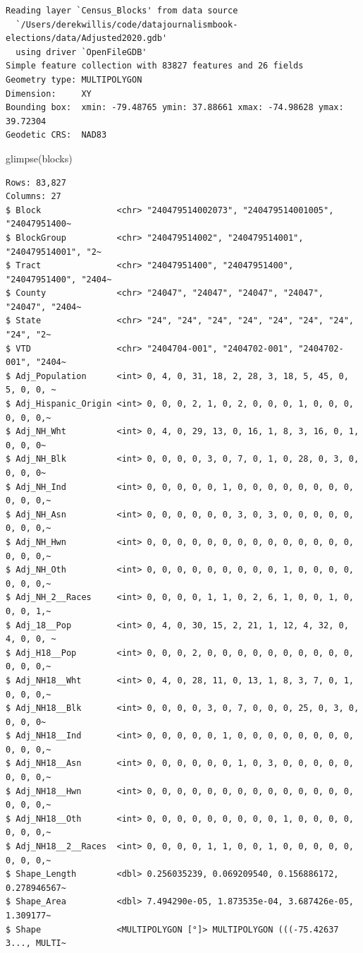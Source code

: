\documentclass[
  letterpaper,
  DIV=11,
  numbers=noendperiod]{scrreprt}
\newenvironment{Shaded}{\begin{snugshade}}{\end{snugshade}}
\newcommand{\FunctionTok}[1]{\textcolor[rgb]{0.28,0.35,0.67}{#1}}
\newcommand{\NormalTok}[1]{\textcolor[rgb]{0.00,0.23,0.31}{#1}}
\begin{document}
\begin{verbatim}
Reading layer `Census_Blocks' from data source 
  `/Users/derekwillis/code/datajournalismbook-elections/data/Adjusted2020.gdb' 
  using driver `OpenFileGDB'
Simple feature collection with 83827 features and 26 fields
Geometry type: MULTIPOLYGON
Dimension:     XY
Bounding box:  xmin: -79.48765 ymin: 37.88661 xmax: -74.98628 ymax: 39.72304
Geodetic CRS:  NAD83
\end{verbatim}

\begin{Shaded}
\begin{Highlighting}[]
\FunctionTok{glimpse}\NormalTok{(blocks)}
\end{Highlighting}
\end{Shaded}

\begin{verbatim}
Rows: 83,827
Columns: 27
$ Block               <chr> "240479514002073", "240479514001005", "24047951400~
$ BlockGroup          <chr> "240479514002", "240479514001", "240479514001", "2~
$ Tract               <chr> "24047951400", "24047951400", "24047951400", "2404~
$ County              <chr> "24047", "24047", "24047", "24047", "24047", "2404~
$ State               <chr> "24", "24", "24", "24", "24", "24", "24", "24", "2~
$ VTD                 <chr> "2404704-001", "2404702-001", "2404702-001", "2404~
$ Adj_Population      <int> 0, 4, 0, 31, 18, 2, 28, 3, 18, 5, 45, 0, 5, 0, 0, ~
$ Adj_Hispanic_Origin <int> 0, 0, 0, 2, 1, 0, 2, 0, 0, 0, 1, 0, 0, 0, 0, 0, 0,~
$ Adj_NH_Wht          <int> 0, 4, 0, 29, 13, 0, 16, 1, 8, 3, 16, 0, 1, 0, 0, 0~
$ Adj_NH_Blk          <int> 0, 0, 0, 0, 3, 0, 7, 0, 1, 0, 28, 0, 3, 0, 0, 0, 0~
$ Adj_NH_Ind          <int> 0, 0, 0, 0, 0, 1, 0, 0, 0, 0, 0, 0, 0, 0, 0, 0, 0,~
$ Adj_NH_Asn          <int> 0, 0, 0, 0, 0, 0, 3, 0, 3, 0, 0, 0, 0, 0, 0, 0, 0,~
$ Adj_NH_Hwn          <int> 0, 0, 0, 0, 0, 0, 0, 0, 0, 0, 0, 0, 0, 0, 0, 0, 0,~
$ Adj_NH_Oth          <int> 0, 0, 0, 0, 0, 0, 0, 0, 0, 1, 0, 0, 0, 0, 0, 0, 0,~
$ Adj_NH_2__Races     <int> 0, 0, 0, 0, 1, 1, 0, 2, 6, 1, 0, 0, 1, 0, 0, 0, 1,~
$ Adj_18__Pop         <int> 0, 4, 0, 30, 15, 2, 21, 1, 12, 4, 32, 0, 4, 0, 0, ~
$ Adj_H18__Pop        <int> 0, 0, 0, 2, 0, 0, 0, 0, 0, 0, 0, 0, 0, 0, 0, 0, 0,~
$ Adj_NH18__Wht       <int> 0, 4, 0, 28, 11, 0, 13, 1, 8, 3, 7, 0, 1, 0, 0, 0,~
$ Adj_NH18__Blk       <int> 0, 0, 0, 0, 3, 0, 7, 0, 0, 0, 25, 0, 3, 0, 0, 0, 0~
$ Adj_NH18__Ind       <int> 0, 0, 0, 0, 0, 1, 0, 0, 0, 0, 0, 0, 0, 0, 0, 0, 0,~
$ Adj_NH18__Asn       <int> 0, 0, 0, 0, 0, 0, 1, 0, 3, 0, 0, 0, 0, 0, 0, 0, 0,~
$ Adj_NH18__Hwn       <int> 0, 0, 0, 0, 0, 0, 0, 0, 0, 0, 0, 0, 0, 0, 0, 0, 0,~
$ Adj_NH18__Oth       <int> 0, 0, 0, 0, 0, 0, 0, 0, 0, 1, 0, 0, 0, 0, 0, 0, 0,~
$ Adj_NH18__2__Races  <int> 0, 0, 0, 0, 1, 1, 0, 0, 1, 0, 0, 0, 0, 0, 0, 0, 0,~
$ Shape_Length        <dbl> 0.256035239, 0.069209540, 0.156886172, 0.278946567~
$ Shape_Area          <dbl> 7.494290e-05, 1.873535e-04, 3.687426e-05, 1.309177~
$ Shape               <MULTIPOLYGON [°]> MULTIPOLYGON (((-75.42637 3..., MULTI~
\end{verbatim}
\end{document}
